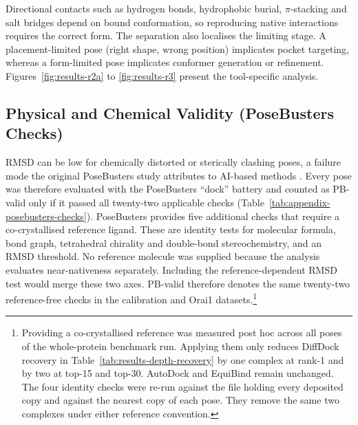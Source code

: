 Directional contacts such as hydrogen bonds, hydrophobic burial, \ensuremath{\pi}-stacking and salt bridges depend on bound conformation, so reproducing native interactions requires the correct form. The separation also localises the limiting stage. A placement-limited pose (right shape, wrong position) implicates pocket targeting, whereas a form-limited pose implicates conformer generation or refinement. Figures~\ref{fig:results-r2a} to \ref{fig:results-r3} present the tool-specific analysis.

\hypertarget{physical-and-chemical-validity-posebusters-checks}{%
\subsection{Physical and Chemical Validity (PoseBusters Checks)}\label{physical-and-chemical-validity-posebusters-checks}}

RMSD can be low for chemically distorted or sterically clashing poses, a failure mode the original PoseBusters study attributes to AI-based methods \cite{ref035}. Every pose was therefore evaluated with the PoseBusters ``dock'' battery and counted as PB-valid only if it passed all twenty-two applicable checks (Table~\ref{tab:appendix-posebusters-checks}). PoseBusters provides five additional checks that require a co-crystallised reference ligand. These are identity tests for molecular formula, bond graph, tetrahedral chirality and double-bond stereochemistry, and an RMSD threshold. No reference molecule was supplied because the analysis evaluates near-nativeness separately. Including the reference-dependent RMSD test would merge these two axes. PB-valid therefore denotes the same twenty-two reference-free checks in the calibration and Orai1 datasets.\footnote{Providing a co-crystallised reference was measured post hoc across all poses of the whole-protein benchmark run. Applying them only reduces DiffDock recovery in Table~\ref{tab:results-depth-recovery} by one complex at rank-1 and by two at top-15 and top-30. AutoDock and EquiBind remain unchanged. The four identity checks were re-run against the file holding every deposited copy and against the nearest copy of each pose. They remove the same two complexes under either reference convention.}

